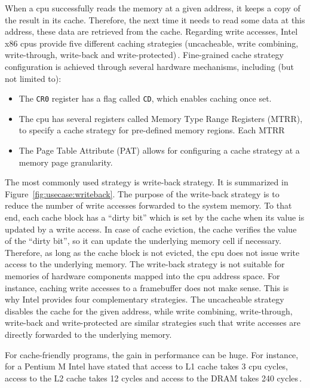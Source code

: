 When a \ac{cpu} successfully reads the memory at a given address, it keeps a
copy of the result in its cache.
%
Therefore, the next time it needs to read some data at this address, these data
are retrieved from the cache.
%
Regarding write accesses, Intel x86 \acp{cpu} provide five different caching
strategies (uncacheable, write combining, write-through, write-back and
write-protected)\,\cite[Volume 3, Chapter~11]{intel2014manual}.
%
Fine-grained cache strategy configuration is achieved through several hardware
mechanisms, including (but not limited to):
%
\begin{itemize}
\item The \texttt{CR0} register has a flag called \texttt{CD}, which enables
  caching once set.
%
\item The \ac{cpu} has several registers called Memory Type Range Registers
  (MTRR), to specify a cache strategy for pre-defined memory regions.
  Each MTRR
\item The Page Table Attribute (PAT) allows for configuring a cache strategy at
  a memory page granularity.
\end{itemize}
%
The most commonly used strategy is write-back strategy.
%
It is summarized in Figure~\ref{fig:usecase:writeback}.
%
The purpose of the write-back strategy is to reduce the number of write accesses
forwarded to the system memory.
%
To that end, each cache block has a ``dirty bit'' which is set by the cache when
its value is updated by a write access.
%
In case of cache eviction, the cache verifies the value of the ``dirty bit'', so
it can update the underlying memory cell if necessary.
%
Therefore, as long as the cache block is not evicted, the \ac{cpu} does not
issue write access to the underlying memory.
%
The write-back strategy is not suitable for memories of hardware components
mapped into the \ac{cpu} address space.
%
For instance, caching write accesses to a framebuffer does not make sense.
%
This is why Intel provides four complementary strategies.
%
The uncacheable strategy disables the cache for the given address, while write
combining, write-through, write-back and write-protected are similar strategies
such that write accesses are directly forwarded to the underlying memory.

For cache-friendly programs, the gain in performance can be huge.
%
For instance, for a Pentium M Intel have stated that access to L1 cache takes
3 \ac{cpu} cycles, access to the L2 cache takes 12 cycles and access to
the DRAM takes 240 cycles\,\cite{drepper2007memory}.

